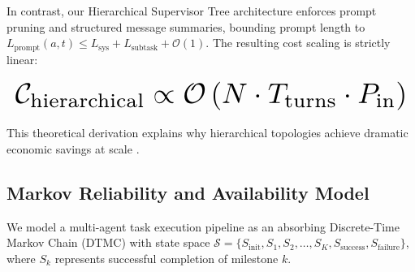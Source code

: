 \documentclass[10pt,journal,compsoc,twocolumn]{IEEEtran}
\begin{document}
In contrast, our Hierarchical Supervisor Tree architecture enforces prompt pruning and structured message summaries, bounding prompt length to $L_{\text{prompt}}(a, t) \le L_{\text{sys}} + L_{\text{subtask}} + \mathcal{O}(1)$. The resulting cost scaling is strictly linear:


























\begin{equation}
\resizebox{\columnwidth}{!}{$\displaystyle
\begin{aligned}
\mathcal{C}_{\text{hierarchical}} \propto \mathcal{O}\left(N \cdot T_{\text{turns}} \cdot P_{\text{in}}\right)
\end{aligned}
$}
\end{equation}


























This theoretical derivation explains why hierarchical topologies achieve dramatic economic savings at scale \cite{arxiv_2501_02497}.




\subsection{Markov Reliability and Availability Model}


We model a multi-agent task execution pipeline as an absorbing Discrete-Time Markov Chain (DTMC) with state space $\mathcal{S} = \{S_{\text{init}}, S_1, S_2, \ldots, S_K, S_{\text{success}}, S_{\text{failure}}\}$, where $S_k$ represents successful completion of milestone $k$.
\end{document}
